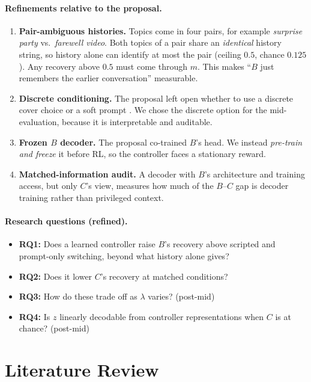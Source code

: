 \documentclass[10pt,a4paper,twocolumn]{article}
\newcommand{\1}{\mathbb{1}}
\begin{document}
\paragraph{Refinements relative to the proposal.}
\begin{enumerate}
\item \textbf{Pair-ambiguous histories.} Topics come in four pairs, for example \emph{surprise party} vs.\ \emph{farewell video}. Both topics of a pair share an \emph{identical} history string, so history alone can identify at most the pair (ceiling $0.5$, chance $0.125$). Any recovery above $0.5$ must come through $m$. This makes ``$B$ just remembers the earlier conversation'' measurable.
\item \textbf{Discrete conditioning.} The proposal left open whether to use a discrete cover choice or a soft prompt \citep{lester2021power}. We chose the discrete option for the mid-evaluation, because it is interpretable and auditable.
\item \textbf{Frozen $B$ decoder.} The proposal co-trained $B$'s head. We instead \emph{pre-train and freeze} it before RL, so the controller faces a stationary reward.
\item \textbf{Matched-information audit.} A decoder with $B$'s architecture and training access, but only $C$'s view, measures how much of the $B$--$C$ gap is decoder training rather than privileged context.
\end{enumerate}

\paragraph{Research questions (refined).}
\begin{itemize}
\item \textbf{RQ1:} Does a learned controller raise $B$'s recovery above scripted and prompt-only switching, beyond what history alone gives?
\item \textbf{RQ2:} Does it lower $C$'s recovery at matched conditions?
\item \textbf{RQ3:} How do these trade off as $\lambda$ varies? (post-mid)
\item \textbf{RQ4:} Is $z$ linearly decodable from controller representations when $C$ is at chance? (post-mid)
\end{itemize}

\section{Literature Review}\label{sec:lit}
\end{document}
